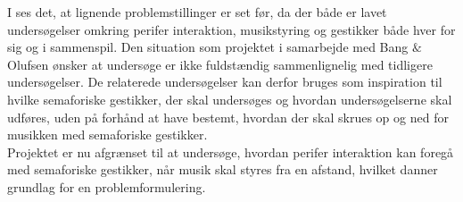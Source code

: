 I  ses det, at lignende problemstillinger er set før, da der både er lavet undersøgelser omkring perifer interaktion, musikstyring og gestikker både hver for sig og i sammenspil. Den situation som projektet i samarbejde med Bang $\&$ Olufsen ønsker at undersøge er ikke fuldstændig sammenlignelig med tidligere undersøgelser. De relaterede undersøgelser kan derfor bruges som inspiration til hvilke semaforiske gestikker, der skal undersøges og hvordan undersøgelserne skal udføres, uden på forhånd at have bestemt, hvordan der skal skrues op og ned for musikken med semaforiske gestikker. \\

Projektet er nu afgrænset til at undersøge, hvordan perifer interaktion kan foregå med semaforiske gestikker, når musik skal styres fra en afstand, hvilket danner grundlag for en problemformulering.
